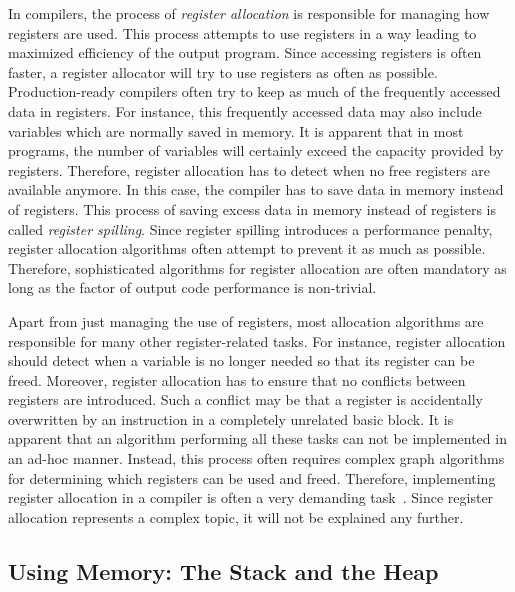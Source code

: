 In compilers, the process of \emph{register allocation} is responsible for managing how registers are used.
This process attempts to use registers in a way leading to maximized efficiency of the output program.
Since accessing registers is often faster, a register allocator will try to use registers as often as possible.
Production-ready compilers often try to keep as much of the frequently accessed data in registers.
For instance, this frequently accessed data may also include variables which are normally saved in memory.
It is apparent that in most programs, the number of variables will certainly exceed the capacity provided by registers.
Therefore, register allocation has to detect when no free registers are available anymore.
In this case, the compiler has to save data in memory instead of registers.
This process of saving excess data in memory instead of registers is called \emph{register spilling}.
Since register spilling introduces a performance penalty, register allocation algorithms often attempt to prevent it as much as possible.
Therefore, sophisticated algorithms for register allocation are often mandatory as long as the factor of output code performance is non-trivial.

Apart from just managing the use of registers, most allocation algorithms are responsible for many other register-related tasks.
For instance, register allocation should detect when a variable is no longer needed so that its register can be freed.
Moreover, register allocation has to ensure that no conflicts between registers are introduced.
Such a conflict may be that a register is accidentally overwritten by an instruction in a completely unrelated basic block.
It is apparent that an algorithm performing all these tasks can not be implemented in an ad-hoc manner.
Instead, this process often requires complex graph algorithms for determining which registers can be used and freed.
Therefore, implementing register allocation in a compiler is often a very demanding task~\cite[pp.212-214]{Watson2017}.
Since register allocation represents a complex topic, it will not be explained any further.

\subsection{Using Memory: The Stack and the Heap}
\\
\\

